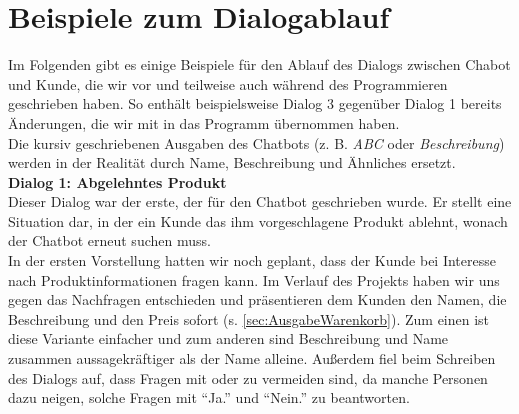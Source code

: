 \chapter{Beispiele zum Dialogablauf}
\label{sec:Beispieldialog}

Im Folgenden gibt es einige Beispiele für den Ablauf des Dialogs zwischen Chabot und Kunde, die wir vor und teilweise auch während des Programmieren geschrieben haben. So enthält beispielsweise Dialog 3 gegenüber Dialog 1 bereits Änderungen, die wir mit in das Programm übernommen haben.\\
Die kursiv geschriebenen Ausgaben des Chatbots (z. B. \textit{ABC} oder \textit{Beschreibung}) werden in der Realität durch Name, Beschreibung und Ähnliches ersetzt.\\

\Large\textbf{Dialog 1: Abgelehntes Produkt}\\
\normalsize
Dieser Dialog war der erste, der für den Chatbot geschrieben wurde. Er stellt eine Situation dar, in der ein Kunde das ihm vorgeschlagene Produkt ablehnt, wonach der Chatbot erneut suchen muss.\\
In der ersten Vorstellung hatten wir noch geplant, dass der Kunde bei Interesse nach Produktinformationen fragen kann. Im Verlauf des Projekts haben wir uns gegen das Nachfragen entschieden und präsentieren dem Kunden den Namen, die Beschreibung und den Preis sofort (s. \ref{sec:AusgabeWarenkorb}). Zum einen ist diese Variante einfacher und zum anderen sind Beschreibung und Name zusammen aussagekräftiger als der Name alleine.
Außerdem fiel beim Schreiben des Dialogs auf, dass Fragen mit oder zu vermeiden sind, da manche Personen dazu neigen, solche Fragen mit "`Ja."' und "`Nein."' zu beantworten.
